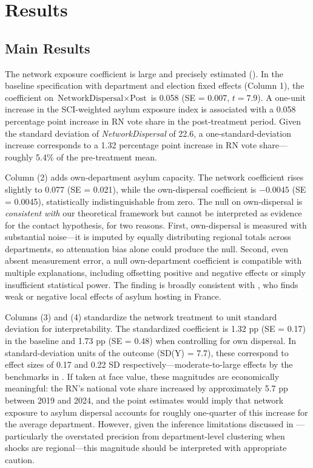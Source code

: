 \documentclass[12pt]{article}
\begin{document}
\section{Results}
\label{sec:results}

\subsection{Main Results}



The network exposure coefficient is large and precisely estimated (). In the baseline specification with department and election fixed effects (Column 1), the coefficient on $\text{NetworkDispersal} \times \text{Post}$ is 0.058 (SE = 0.007, $t = 7.9$). A one-unit increase in the SCI-weighted asylum exposure index is associated with a 0.058 percentage point increase in RN vote share in the post-treatment period. Given the standard deviation of \textit{NetworkDispersal} of 22.6, a one-standard-deviation increase corresponds to a 1.32 percentage point increase in RN vote share---roughly 5.4\% of the pre-treatment mean.

Column (2) adds own-department asylum capacity. The network coefficient rises slightly to 0.077 (SE = 0.021), while the own-dispersal coefficient is $-0.0045$ (SE = 0.0045), statistically indistinguishable from zero. The null on own-dispersal is \textit{consistent with} our theoretical framework but cannot be interpreted as evidence for the contact hypothesis, for two reasons. First, own-dispersal is measured with substantial noise---it is imputed by equally distributing regional totals across departments, so attenuation bias alone could produce the null. Second, even absent measurement error, a null own-department coefficient is compatible with multiple explanations, including offsetting positive and negative effects or simply insufficient statistical power. The finding is broadly consistent with \citet{schneider2024stranger}, who finds weak or negative local effects of asylum hosting in France.

Columns (3) and (4) standardize the network treatment to unit standard deviation for interpretability. The standardized coefficient is 1.32 pp (SE = 0.17) in the baseline and 1.73 pp (SE = 0.48) when controlling for own dispersal. In standard-deviation units of the outcome (SD(Y) = 7.7), these correspond to effect sizes of 0.17 and 0.22 SD respectively---moderate-to-large effects by the benchmarks in \citet{autor2020importing}. If taken at face value, these magnitudes are economically meaningful: the RN's national vote share increased by approximately 5.7 pp between 2019 and 2024, and the point estimates would imply that network exposure to asylum dispersal accounts for roughly one-quarter of this increase for the average department. However, given the inference limitations discussed in ---particularly the overstated precision from department-level clustering when shocks are regional---this magnitude should be interpreted with appropriate caution.
\end{document}
